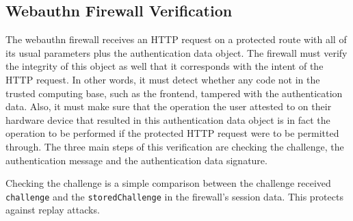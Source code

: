 

\subsection{Webauthn Firewall Verification}\label{Sec:WebauthnFirewallVerification}

The webauthn firewall receives an HTTP request on a protected route with all of its usual parameters plus the authentication data object. The firewall must verify the integrity of this object as well that it corresponds with the intent of the HTTP request. In other words, it must detect whether any code not in the trusted computing base, such as the frontend, tampered with the authentication data. Also, it must make sure that the operation the user attested to on their hardware device that resulted in this authentication data object is in fact the operation to be performed if the protected HTTP request were to be permitted through. The three main steps of this verification are checking the challenge, the authentication message and the authentication data signature.

Checking the challenge is a simple comparison between the challenge received \lstinline{challenge} and the \lstinline{storedChallenge} in the firewall's session data. This protects against replay attacks.


